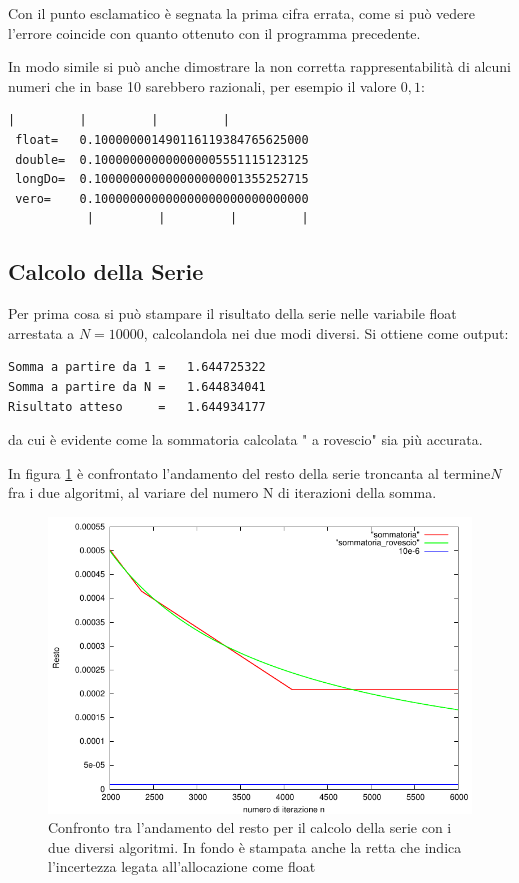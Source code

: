 \documentclass{article}
\begin{document}
Con il punto esclamatico è segnata la prima cifra errata, come si può vedere l'errore coincide con quanto ottenuto con il programma precedente.

In modo simile si può anche dimostrare la non corretta rappresentabilità di alcuni numeri che in base 10 sarebbero razionali, per esempio il valore $0,1$:

\begin{lstlisting}[frame=single]
           |         |         |         |
 float=   0.100000001490116119384765625000 
 double=  0.100000000000000005551115123125 
 longDo=  0.100000000000000000001355252715 
 vero=    0.100000000000000000000000000000
           |         |         |         |
\end{lstlisting}


\subsection{Calcolo della Serie}

Per prima cosa si può stampare il risultato della serie nelle variabile float arrestata a $ N=10000$, calcolandola nei due modi diversi.
Si ottiene come output:

\begin{lstlisting}[frame=single]
Somma a partire da 1 =	 1.644725322
Somma a partire da N =	 1.644834041
Risultato atteso	 =	 1.644934177
\end{lstlisting}

da cui è evidente come la sommatoria calcolata " a rovescio" sia più accurata.

In figura \ref{fig:confo} è confrontato l'andamento del resto della serie troncanta al termine$N$ fra i due algoritmi, al variare del numero N di iterazioni della somma.

\begin{figure}[!h]
\centering
\includegraphics[width=14cm,keepaspectratio]{picture/confronto}
\caption{Confronto tra l'andamento del resto per il calcolo della serie con i due diversi algoritmi. In fondo è stampata anche la retta che indica l'incertezza legata all'allocazione come float}
\label{fig:confo}
\end{figure}
\end{document}
